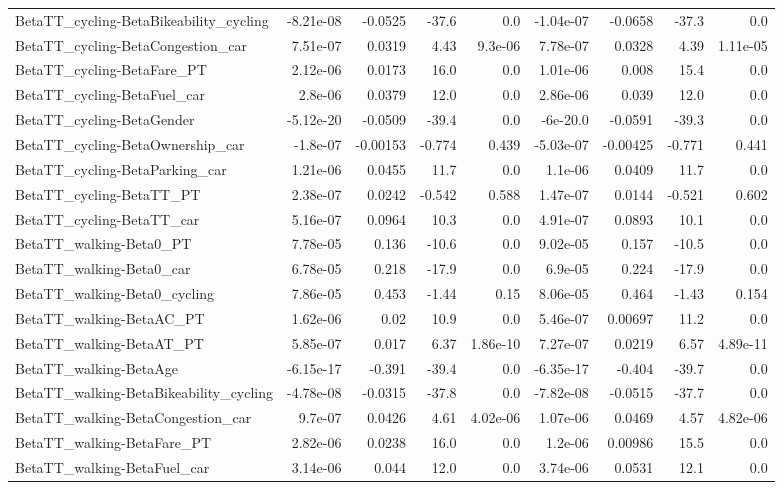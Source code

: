 \begin{tabular}{lrrrrrrrr}
BetaTT_cycling-BetaBikeability_cycling & -8.21e-08 & -0.0525 & -37.6 & 0.0 & -1.04e-07 & -0.0658 & -37.3 & 0.0 \\
BetaTT_cycling-BetaCongestion_car & 7.51e-07 & 0.0319 & 4.43 & 9.3e-06 & 7.78e-07 & 0.0328 & 4.39 & 1.11e-05 \\
BetaTT_cycling-BetaFare_PT & 2.12e-06 & 0.0173 & 16.0 & 0.0 & 1.01e-06 & 0.008 & 15.4 & 0.0 \\
BetaTT_cycling-BetaFuel_car & 2.8e-06 & 0.0379 & 12.0 & 0.0 & 2.86e-06 & 0.039 & 12.0 & 0.0 \\
BetaTT_cycling-BetaGender & -5.12e-20 & -0.0509 & -39.4 & 0.0 & -6e-20.0 & -0.0591 & -39.3 & 0.0 \\
BetaTT_cycling-BetaOwnership_car & -1.8e-07 & -0.00153 & -0.774 & 0.439 & -5.03e-07 & -0.00425 & -0.771 & 0.441 \\
BetaTT_cycling-BetaParking_car & 1.21e-06 & 0.0455 & 11.7 & 0.0 & 1.1e-06 & 0.0409 & 11.7 & 0.0 \\
BetaTT_cycling-BetaTT_PT & 2.38e-07 & 0.0242 & -0.542 & 0.588 & 1.47e-07 & 0.0144 & -0.521 & 0.602 \\
BetaTT_cycling-BetaTT_car & 5.16e-07 & 0.0964 & 10.3 & 0.0 & 4.91e-07 & 0.0893 & 10.1 & 0.0 \\
BetaTT_walking-Beta0_PT & 7.78e-05 & 0.136 & -10.6 & 0.0 & 9.02e-05 & 0.157 & -10.5 & 0.0 \\
BetaTT_walking-Beta0_car & 6.78e-05 & 0.218 & -17.9 & 0.0 & 6.9e-05 & 0.224 & -17.9 & 0.0 \\
BetaTT_walking-Beta0_cycling & 7.86e-05 & 0.453 & -1.44 & 0.15 & 8.06e-05 & 0.464 & -1.43 & 0.154 \\
BetaTT_walking-BetaAC_PT & 1.62e-06 & 0.02 & 10.9 & 0.0 & 5.46e-07 & 0.00697 & 11.2 & 0.0 \\
BetaTT_walking-BetaAT_PT & 5.85e-07 & 0.017 & 6.37 & 1.86e-10 & 7.27e-07 & 0.0219 & 6.57 & 4.89e-11 \\
BetaTT_walking-BetaAge & -6.15e-17 & -0.391 & -39.4 & 0.0 & -6.35e-17 & -0.404 & -39.7 & 0.0 \\
BetaTT_walking-BetaBikeability_cycling & -4.78e-08 & -0.0315 & -37.8 & 0.0 & -7.82e-08 & -0.0515 & -37.7 & 0.0 \\
BetaTT_walking-BetaCongestion_car & 9.7e-07 & 0.0426 & 4.61 & 4.02e-06 & 1.07e-06 & 0.0469 & 4.57 & 4.82e-06 \\
BetaTT_walking-BetaFare_PT & 2.82e-06 & 0.0238 & 16.0 & 0.0 & 1.2e-06 & 0.00986 & 15.5 & 0.0 \\
BetaTT_walking-BetaFuel_car & 3.14e-06 & 0.044 & 12.0 & 0.0 & 3.74e-06 & 0.0531 & 12.1 & 0.0 \\

\end{tabular}
